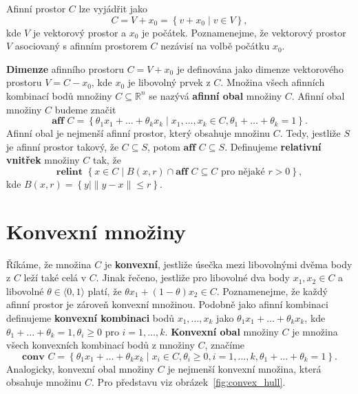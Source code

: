 \noindent Afinní prostor $C$ lze vyjádřit jako
$$
    C = V + x_0 = \left\{ v + x_0 \mid v \in V \right\},
$$
kde $V$ je vektorový prostor a $x_0$ je počátek. Poznamenejme, že vektorový prostor $V$ asociovaný s afinním prostorem $C$ nezávisí na volbě počátku $x_0$.

\noindent \textbf{Dimenze} afinního prostoru $C = V + x_0$ je definována jako dimenze vektorového prostoru $V = C - x_0$, kde $x_0$ je libovolný prvek z $C$. Množina všech afinních kombinací bodů množiny $C \subseteq \mathbb{R}^n$ se nazývá \textbf{afinní obal} množiny $C$. Afinní obal množiny $C$ budeme značit
$$
    \textbf{aff } C = \left\{ \theta_1 x_1 + \dots + \theta_k x_k \mid x_1, \dots, x_k \in C, \theta_1 + \dots + \theta_k = 1 \right\}.
$$
Afinní obal je nejmenší afinní prostor, který obsahuje množinu $C$. Tedy, jestliže $S$ je afinní prostor takový, že $C \subseteq S$, potom $\textbf{aff }C \subseteq S$. Definujeme \textbf{relativní vnitřek} množiny $C$ tak, že
$$
    \textbf{relint }\left\{ x \in C \mid B(x,r) \cap \textbf{aff }C \subseteq C \text{ pro nějaké } r > 0 \right\},
$$
kde $B(x,r) = \left\{ y \mid \| y - x \| \leq r \right\}$.


\section{Konvexní množiny}

Říkáme, že množina $C$ je \textbf{konvexní}, jestliže úsečka mezi libovolnými dvěma body z $C$ leží také celá v $C$. Jinak řečeno, jestliže pro libovolné dva body $x_1, x_2 \in C$ a libovolné $\theta \in \langle 0, 1 \rangle$ platí, že $\theta x_1 + (1 - \theta) x_2 \in C$. Poznamenejme, že každý afinní prostor je zároveň konvexní množinou. Podobně jako afinní kombinaci definujeme \textbf{konvexní kombinaci} bodů $x_1, \dots, x_k$ jako $\theta_1 x_1 + \dots + \theta_k x_k$, kde $\theta_1 + \dots + \theta_k = 1, \theta_i \geq 0$ pro $i = 1, \dots, k$. \textbf{Konvexní obal} množiny $C$ je množina všech konvexních kombinací bodů z množiny $C$, značíme
$$
    \textbf{conv }C = \left\{ \theta_1 x_1 + \dots + \theta_k x_k \mid x_i \in C, \theta_i \geq 0, i = 1, \dots, k, \theta_1 + \dots + \theta_k = 1 \right\}.
$$
Analogicky, konvexní obal množiny $C$ je nejmenší konvexní množina, která obsahuje množinu $C$. Pro představu viz obrázek~\ref{fig:convex_hull}.

